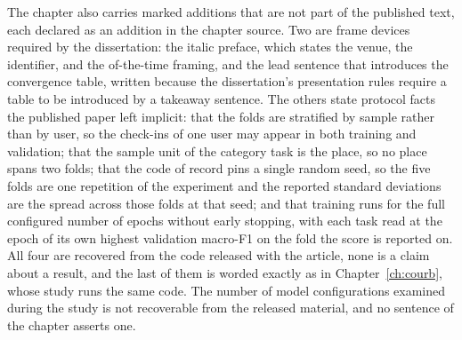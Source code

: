 The chapter also carries marked additions that are not part of the published text, each
declared as an addition in the chapter source. Two are frame devices required by the
dissertation: the italic preface, which states the venue, the identifier, and the
of-the-time framing, and the lead sentence that introduces the convergence table, written
because the dissertation's presentation rules require a table to be introduced by a
takeaway sentence. The others state protocol facts the published paper left implicit: that
the folds are stratified by sample rather than by user, so the check-ins of one user may
appear in both training and validation; that the sample unit of the category task is the
place, so no place spans two folds; that the code of record pins a single random seed, so
the five folds are one repetition of the experiment and the reported standard deviations
are the spread across those folds at that seed; and that training runs for the full
configured number of epochs without early stopping, with each task read at the epoch of
its own highest validation macro-F1 on the fold the score is reported on. All four are
recovered from the code released with the article, none is a claim about a result, and the
last of them is worded exactly as in Chapter~\ref{ch:courb}, whose study runs the same
code. The number of model configurations examined during the study is not recoverable from
the released material, and no sentence of the chapter asserts one.

